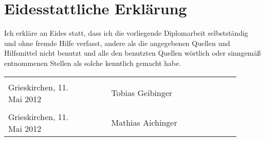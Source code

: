 
{}

\section*{Eidesstattliche Erklärung}

Ich erkläre an Eides statt, dass ich die vorliegende Diplomarbeit selbstständig und ohne fremde Hilfe verfasst, andere als die angegebenen Quellen und Hilfsmittel nicht benutzt und alle den benutzten Quellen wörtlich oder sinngemäß entnommenen Stellen als solche kenntlich gemacht habe.
\begin{flushleft}
	\footnotesize
	\begin{tabular}{@{}p{0.3\linewidth}p{0.1\linewidth}>{\centering\arraybackslash}p{0.5\linewidth}}
		& & \\ \cline{3-3} Grieskirchen, 11. Mai 2012 & & Tobias Geibinger \\ [2\baselineskip]
		& & \\ \cline{3-3} Grieskirchen, 11. Mai 2012 & & Mathias Aichinger \\
	\end{tabular}
\end{flushleft}

%
%
